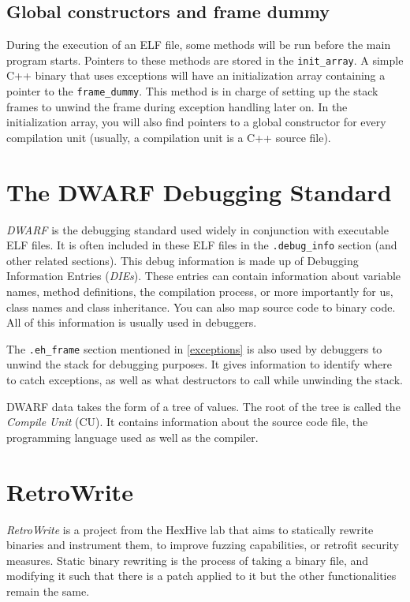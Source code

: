 \documentclass[a4paper,11pt,oneside]{report}
\begin{document}
\subsection{Global constructors and frame dummy}
\label{framedummy}

During the execution of an ELF file, some methods will be run before the main
program starts. Pointers to these methods are stored in the
\texttt{init\_array}.
A simple C++ binary that uses exceptions will have an initialization array
containing a pointer to the \texttt{frame\_dummy}. This method is in charge of
setting up the stack frames to unwind the frame during exception handling
later on.
In the initialization array, you will also find pointers to a global
constructor for every compilation unit (usually, a compilation unit is a C++
source file).


\section{The DWARF Debugging Standard}
\label{dwarf}

\emph{DWARF} is the debugging standard used widely in conjunction with 
executable ELF files.
It is often included in these ELF files in the \texttt{.debug\_info} section 
(and other related sections).
This debug information is made up of Debugging Information Entries 
(\emph{DIEs}).
These entries can contain information about variable names, method definitions, 
the compilation process, or more importantly for us, class names and class 
inheritance. You can also map source code to binary code.
All of this information is usually used in debuggers.

The \texttt{.eh\_frame} section mentioned in \autoref{exceptions} is also used
by debuggers to unwind the stack for debugging purposes.
It gives information to identify where to catch exceptions, as well as what
destructors to call while unwinding the stack.

DWARF data takes the form of a tree of values.
The root of the tree is called the \emph{Compile Unit} (CU).
It contains information about the source code file, the programming language
used as well as the compiler.


\section{RetroWrite} \label{retrowritesection}

\emph{RetroWrite}\cite{dinesh20oakland} is a project from the
HexHive lab that aims to statically rewrite binaries and instrument them, to
improve fuzzing capabilities, or retrofit security measures.
Static binary rewriting is the process of taking a binary file, and modifying
it such that there is a patch applied to it but the other functionalities
remain the same.
\end{document}
